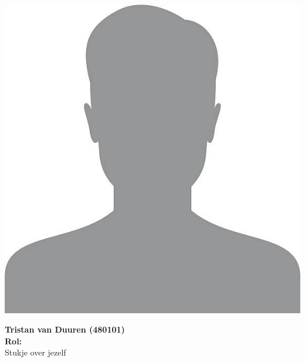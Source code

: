 \documentclass{BK5}
\begin{document}
	\vspace{1cm}
	
	\begin{minipage}{0.5\linewidth}
		\includegraphics[width=\linewidth]{unknown.jpg}
	\end{minipage}
	\hfill
	\vspace{1cm}
	\begin{minipage}{\linewidth}
		\textbf{Tristan van Duuren (480101)} \\
		\textbf{Rol:}  \\
		Stukje over jezelf
	\end{minipage}
	
	\vspace{1cm}
	\newpage
	
\end{document}
